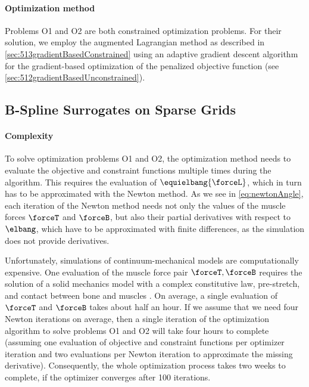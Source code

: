 \paragraph{Optimization method}
%
Problems O1 and O2 are both constrained optimization problems.
For their solution, we employ the augmented Lagrangian method as
described in \cref{sec:513gradientBasedConstrained}
using an adaptive gradient descent algorithm
for the gradient-based optimization of the penalized objective function
(see \cref{sec:512gradientBasedUnconstrained}).



\subsection{B-Spline Surrogates on Sparse Grids}
\label{sec:723surrogates}

\paragraph{Complexity}

To solve optimization problems O1 and O2,
the optimization method needs to evaluate the objective
and constraint functions multiple times during the algorithm.
This requires the evaluation of $\equielbang{\forceL}$,
which in turn has to be approximated with the Newton method.
As we see in \cref{eq:newtonAngle},
each iteration of the Newton method needs not only the values of the
muscle forces $\forceT$ and $\forceB$, but also their
partial derivatives with respect to $\elbang$,
which have to be approximated with finite differences,
as the simulation does not provide derivatives.

Unfortunately, simulations of continuum-mechanical models are
computationally expensive.
One evaluation of the muscle force pair $\forceT, \forceB$
requires the solution of a solid mechanics model
with a complex constitutive law, pre-stretch, and contact between
bone and muscles \cite{Valentin18Gradient}.
On average, a single evaluation of $\forceT$ and $\forceB$ takes
about half an hour.
%
If we assume that we need four Newton iterations on average,
then a single iteration of the optimization algorithm to solve
problems O1 and O2 will take four hours to complete
(assuming one evaluation of objective and constraint functions
per optimizer iteration and
two evaluations per Newton iteration to approximate the missing derivative).
Consequently, the whole optimization process takes
two weeks to complete, if the optimizer converges after 100 iterations.

